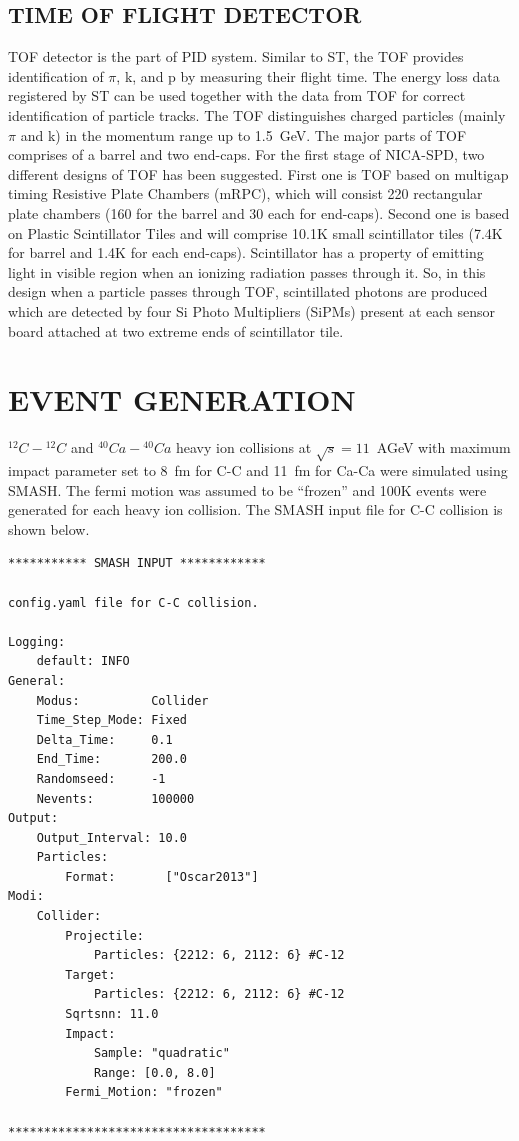 \documentclass[12pt]{article}
\begin{document}
\subsection{TIME OF FLIGHT DETECTOR}
TOF detector is the part of PID system. Similar to ST, the TOF provides identification of $\pi$, k, and p by measuring their flight time. The energy loss data registered by ST can be used together with the data from TOF for correct identification of particle tracks. The TOF distinguishes charged particles (mainly $\pi$ and k) in the momentum range up to 1.5~GeV. The major parts of TOF comprises of a barrel and two end-caps. For the first stage of NICA-SPD, two different designs of TOF has been suggested. First one is TOF based on multigap timing Resistive Plate Chambers (mRPC), which will consist 220 rectangular plate chambers (160 for the barrel and 30 each for end-caps). Second one is based on Plastic Scintillator Tiles and will comprise 10.1K small scintillator tiles (7.4K for barrel and 1.4K for each end-caps). Scintillator has a property of emitting light in visible region when an ionizing radiation passes through it. So, in this design when a particle passes through TOF, scintillated photons are produced which are detected by four Si Photo Multipliers (SiPMs) present at each sensor board attached at two extreme ends of scintillator tile.

\section{EVENT GENERATION}
$^{12}C-{^{12}C}$ and $^{40}Ca-{^{40}Ca}$ heavy ion collisions at $\sqrt{s}=11$~AGeV with maximum impact parameter set to 8~fm for C-C and 11~fm for Ca-Ca were simulated using SMASH. The fermi motion was assumed to be ``frozen'' and 100K events were generated for each heavy ion collision. The SMASH input file for C-C collision is shown below.
{\small 
\begin{verbatim}
*********** SMASH INPUT ************

config.yaml file for C-C collision.

Logging:
    default: INFO
General:
    Modus:          Collider
    Time_Step_Mode: Fixed
    Delta_Time:     0.1
    End_Time:       200.0
    Randomseed:     -1
    Nevents:        100000
Output:
    Output_Interval: 10.0
    Particles:
        Format:       ["Oscar2013"]
Modi:
    Collider:
        Projectile:
            Particles: {2212: 6, 2112: 6} #C-12
        Target:
            Particles: {2212: 6, 2112: 6} #C-12       
        Sqrtsnn: 11.0        
        Impact:
            Sample: "quadratic"
            Range: [0.0, 8.0]
        Fermi_Motion: "frozen"    
            
************************************
\end{verbatim}
}
\end{document}
